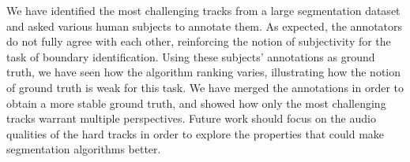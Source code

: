 \documentclass{article}
\begin{document}
We have identified the most challenging tracks from a large segmentation dataset and asked various human subjects to annotate them.
As expected, the annotators do not fully agree with each other, reinforcing the notion of subjectivity for the task of boundary identification.
Using these subjects' annotations as ground truth, we have seen how the algorithm ranking varies, illustrating how the notion of ground truth is weak for this task.
We have merged the annotations in order to obtain a more stable ground truth, and showed how only the most challenging tracks warrant multiple perspectives.
Future work should focus on the audio qualities of the hard tracks in order to explore the properties that could make segmentation algorithms better.












\end{document}
